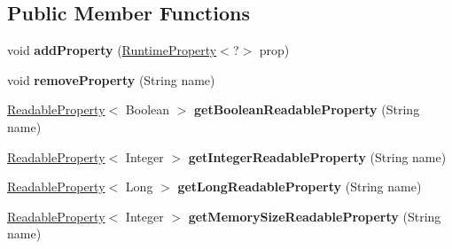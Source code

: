 \subsection*{Public Member Functions}
\begin{DoxyCompactItemize}
\item 
\mbox{\label{classcom_1_1mysql_1_1cj_1_1conf_1_1_default_property_set_aaab8bb4b45a6e77efa0987edee78924c}} 
void {\bfseries add\+Property} (\mbox{\hyperlink{interfacecom_1_1mysql_1_1cj_1_1conf_1_1_runtime_property}{Runtime\+Property}}$<$?$>$ prop)
\item 
\mbox{\label{classcom_1_1mysql_1_1cj_1_1conf_1_1_default_property_set_ae797c54a9e9152a4fd284bc96bc4e12f}} 
void {\bfseries remove\+Property} (String name)
\item 
\mbox{\label{classcom_1_1mysql_1_1cj_1_1conf_1_1_default_property_set_aac90679a7d9bf30e9f122be52f095384}} 
\mbox{\hyperlink{interfacecom_1_1mysql_1_1cj_1_1conf_1_1_readable_property}{Readable\+Property}}$<$ Boolean $>$ {\bfseries get\+Boolean\+Readable\+Property} (String name)
\item 
\mbox{\label{classcom_1_1mysql_1_1cj_1_1conf_1_1_default_property_set_a58ff54d9bc14d56562767d4cec5c510e}} 
\mbox{\hyperlink{interfacecom_1_1mysql_1_1cj_1_1conf_1_1_readable_property}{Readable\+Property}}$<$ Integer $>$ {\bfseries get\+Integer\+Readable\+Property} (String name)
\item 
\mbox{\label{classcom_1_1mysql_1_1cj_1_1conf_1_1_default_property_set_ae3159cdeb5ee6bc987ca800feecef60c}} 
\mbox{\hyperlink{interfacecom_1_1mysql_1_1cj_1_1conf_1_1_readable_property}{Readable\+Property}}$<$ Long $>$ {\bfseries get\+Long\+Readable\+Property} (String name)
\item 
\mbox{\label{classcom_1_1mysql_1_1cj_1_1conf_1_1_default_property_set_ae7157aefbd409a972ffe014ab383d25b}} 
\mbox{\hyperlink{interfacecom_1_1mysql_1_1cj_1_1conf_1_1_readable_property}{Readable\+Property}}$<$ Integer $>$ {\bfseries get\+Memory\+Size\+Readable\+Property} (String name)

\end{DoxyCompactItemize}
